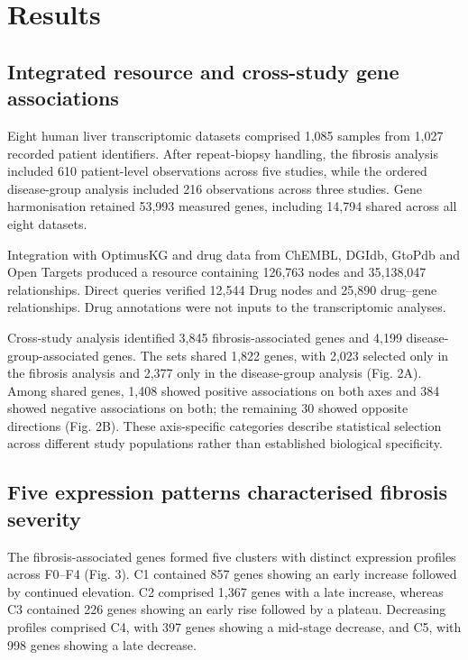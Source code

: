 \section*{Results}

\subsection*{Integrated resource and cross-study gene associations}

Eight human liver transcriptomic datasets comprised 1,085 samples from 1,027 recorded patient identifiers. After repeat-biopsy handling, the fibrosis analysis included 610 patient-level observations across five studies, while the ordered disease-group analysis included 216 observations across three studies. Gene harmonisation retained 53,993 measured genes, including 14,794 shared across all eight datasets.

Integration with OptimusKG and drug data from ChEMBL, DGIdb, GtoPdb and Open Targets produced a resource containing 126,763 nodes and 35,138,047 relationships. Direct queries verified 12,544 Drug nodes and 25,890 drug–gene relationships. Drug annotations were not inputs to the transcriptomic analyses.

Cross-study analysis identified 3,845 fibrosis-associated genes and 4,199 disease-group-associated genes. The sets shared 1,822 genes, with 2,023 selected only in the fibrosis analysis and 2,377 only in the disease-group analysis (Fig. 2A). Among shared genes, 1,408 showed positive associations on both axes and 384 showed negative associations on both; the remaining 30 showed opposite directions (Fig. 2B). These axis-specific categories describe statistical selection across different study populations rather than established biological specificity.

\subsection*{Five expression patterns characterised fibrosis severity}

The fibrosis-associated genes formed five clusters with distinct expression profiles across F0–F4 (Fig. 3). C1 contained 857 genes showing an early increase followed by continued elevation. C2 comprised 1,367 genes with a late increase, whereas C3 contained 226 genes showing an early rise followed by a plateau. Decreasing profiles comprised C4, with 397 genes showing a mid-stage decrease, and C5, with 998 genes showing a late decrease.

